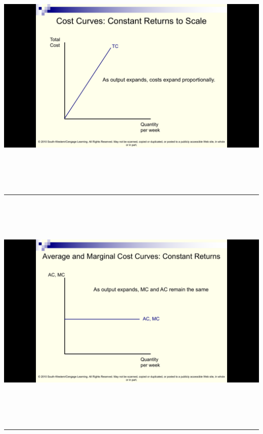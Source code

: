 \documentclass[]{article}
\begin{document}
\includegraphics[height=4.5in]{picsfigs/crsTCcurve.png}

\begin{center}\rule{0.5\linewidth}{\linethickness}\end{center}

\includegraphics[height=4.5in]{picsfigs/crscostcurves}

\begin{center}\rule{0.5\linewidth}{\linethickness}\end{center}
\end{document}
